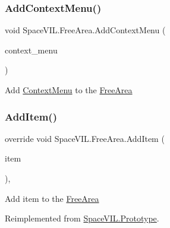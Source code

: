 \subsubsection{\texorpdfstring{Add\+Context\+Menu()}{AddContextMenu()}}
{\footnotesize\ttfamily void Space\+V\+I\+L.\+Free\+Area.\+Add\+Context\+Menu (\begin{DoxyParamCaption}\item[{\mbox{\hyperlink{class_space_v_i_l_1_1_context_menu}{Context\+Menu}}}]{context\+\_\+menu }\end{DoxyParamCaption})\hspace{0.3cm}{\ttfamily [inline]}}



Add \mbox{\hyperlink{class_space_v_i_l_1_1_context_menu}{Context\+Menu}} to the \mbox{\hyperlink{class_space_v_i_l_1_1_free_area}{Free\+Area}} 

\mbox{\label{class_space_v_i_l_1_1_free_area_a9145cbd1711d975fee90fde3187c1aff}} 
\subsubsection{\texorpdfstring{Add\+Item()}{AddItem()}}
{\footnotesize\ttfamily override void Space\+V\+I\+L.\+Free\+Area.\+Add\+Item (\begin{DoxyParamCaption}\item[{\mbox{\hyperlink{interface_space_v_i_l_1_1_core_1_1_i_base_item}{I\+Base\+Item}}}]{item }\end{DoxyParamCaption})\hspace{0.3cm}{\ttfamily [inline]}, {\ttfamily [virtual]}}



Add item to the \mbox{\hyperlink{class_space_v_i_l_1_1_free_area}{Free\+Area}} 



Reimplemented from \mbox{\hyperlink{class_space_v_i_l_1_1_prototype}{Space\+V\+I\+L.\+Prototype}}.

\mbox{\label{class_space_v_i_l_1_1_free_area_ae9b39df00c0fa786b4072b8e49e3aacc}} 
